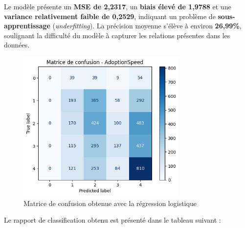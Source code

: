 \documentclass[a4paper,12pt]{article}
\begin{document}
Le modèle présente un \textbf{MSE de 2{,}2317}, un \textbf{biais élevé de 1{,}9788} et une \textbf{variance relativement faible de 0{,}2529}, indiquant un problème de \textbf{sous-apprentissage} (\textit{underfitting}). La précision moyenne s'élève à environ \textbf{26{,}99\%}, soulignant la difficulté du modèle à capturer les relations présentes dans les données.

\begin{figure}[H]

    \centering

    \includegraphics[width=0.75\textwidth]{matrice_confusion_logreg.png}

    \caption{Matrice de confusion obtenue avec la régression logistique}

    \label{fig:confusion_logreg}

\end{figure}

Le rapport de classification obtenu est présenté dans le tableau suivant :
\end{document}
